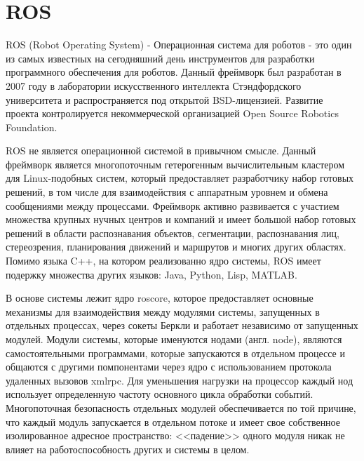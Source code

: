 \section{ROS}

ROS (Robot Operating System) - Операционная система для роботов - это один из самых известных на сегодняшний день инструментов для разработки программного обеспечения для роботов. Данный фреймворк был разработан в 2007 году в лаборатории искусственного интеллекта Стэндфордского университета и распространяется под открытой BSD-лицензией. Развитие проекта контролируется некоммерческой организацией Open Source Robotics Foundation.

ROS не является операционной системой в привычном смысле. Данный фреймворк является многопоточным гетерогенным вычислительным кластером для Linux-подобных систем, который предоставляет разработчику набор готовых решений, в том числе для взаимодействия с аппаратным уровнем и обмена сообщениями между процессами. Фреймворк активно развивается \cite{boren2011exponential} с участием множества крупных нучных центров и компаний и имеет большой набор готовых решений в области распознавания объектов, сегментации, распознавания лиц, стереозрения, планирования движений и маршрутов и многих других областях. Помимо языка C++, на котором реализованно ядро системы, ROS имеет подержку множества других языков: Java, Python, Lisp, MATLAB.

В основе системы лежит ядро roscore, которое предоставляет основные механизмы для взаимодействия между модулями системы, запущенных в отдельных процессах, через сокеты Беркли и работает независимо от запущенных модулей. Модули системы, которые именуются нодами (англ. node),  являются самостоятельными программами, которые запускаются в отдельном процессе и общаются с другими помпонентами через ядро с использованием протокола удаленных вызовов xmlrpc. Для уменьшения нагрузки на процессор каждый нод использует определенную частоту основного цикла обработки событий. Многопоточная безопасность отдельных модулей обеспечивается по той причине, что каждый модуль запускается в отдельном потоке и имеет свое собственное изолированное адресное пространство: <<падение>> одного модуля никак не влияет на работоспособность других и системы в целом.

